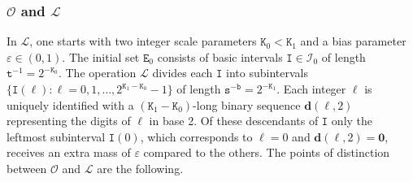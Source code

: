 \documentclass[12pt, twoside]{article}
\theoremstyle{definition}
\numberwithin{equation}{section}
\begin{document}
\subsubsection{$\mathscr{O}$ and $\mathscr{L}$} In $\mathscr{L}$, one starts with two integer scale parameters $\mathtt K_0 < \mathtt K_1$ and a bias parameter $\varepsilon \in (0,1)$. The initial set $\mathtt E_0$ consists of basic intervals $\mathtt I \in \mathscr{I}_0$ of length $\mathtt t^{-1} = 2^{-\mathtt K_0}$. The operation $\mathscr{L}$ divides each $\mathtt I$ into subintervals $\{\mathtt I(\ell) : \ell = 0, 1, \ldots, 2^{\mathtt K_1-\mathtt K_0}-1\}$ of length $\mathtt s^{-\mathtt b} = 2^{- \mathtt K_1}$. Each integer $\ell$ is uniquely identified with a $(\mathtt K_1-\mathtt K_0)$-long binary sequence $\mathbf d(\ell, 2)$ representing the digits of $\ell$ in base 2. Of these descendants of $\mathtt I$ only the leftmost subinterval $\mathtt I( 0)$, which corresponds to $\ell = 0$ and  $\mathbf d(\ell, 2) = \mathbf 0$, receives an extra mass of $\varepsilon$ compared to the others. 
\vskip0.1in 
\noindent The points of distinction between $\mathscr{O}$ and $\mathscr{L}$ are the following.
\end{document}
